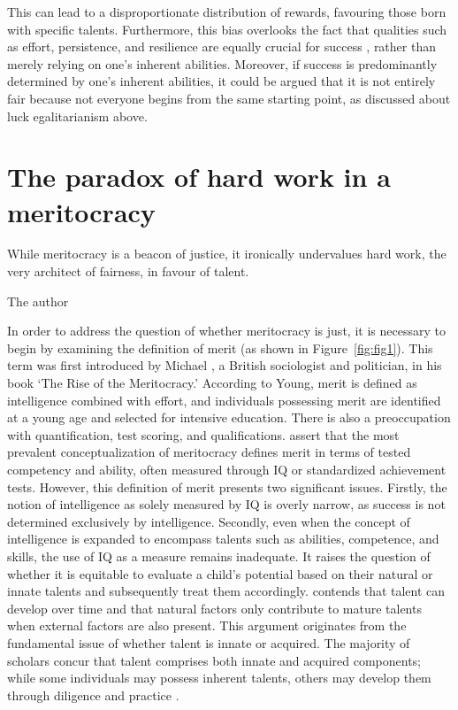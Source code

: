 This can lead to a disproportionate distribution of rewards, favouring those born with specific talents. Furthermore, this bias overlooks the fact that qualities such as effort, persistence, and resilience are equally crucial for success \citep{tsay2011naturals}, rather than merely relying on one’s inherent abilities. Moreover, if success is predominantly determined by one's inherent abilities, it could be argued that it is not entirely fair because not everyone begins from the same starting point, as discussed about luck egalitarianism above.

\section{The paradox of hard work in a meritocracy}

\epigraph{While meritocracy is a beacon of justice, it ironically undervalues hard work, the very architect of fairness, in favour of talent.}{The author}

In order to address the question of whether meritocracy is just, it is necessary to begin by examining the definition of merit (as shown in Figure~\ref{fig:fig1}). This term was first introduced by Michael \citet{young1958rise}, a British sociologist and politician, in his book ‘The Rise of the Meritocracy.’ According to Young, merit is defined as intelligence combined with effort, and individuals possessing merit are identified at a young age and selected for intensive education. There is also a preoccupation with quantification, test scoring, and qualifications. \citet{ballantine2021sociology} assert that the most prevalent conceptualization of meritocracy defines merit in terms of tested competency and ability, often measured through IQ or standardized achievement tests. However, this definition of merit presents two significant issues. Firstly, the notion of intelligence as solely measured by IQ is overly narrow, as success is not determined exclusively by intelligence. Secondly, even when the concept of intelligence is expanded to encompass talents such as abilities, competence, and skills, the use of IQ as a measure remains inadequate. It raises the question of whether it is equitable to evaluate a child’s potential based on their natural or innate talents and subsequently treat them accordingly. \citet{meyer2022talents} contends that talent can develop over time and that natural factors only contribute to mature talents when external factors are also present. This argument originates from the fundamental issue of whether talent is innate or acquired. The majority of scholars concur that talent comprises both innate and acquired components; while some individuals may possess inherent talents, others may develop them through diligence and practice \citep{meyers2013talent}.

